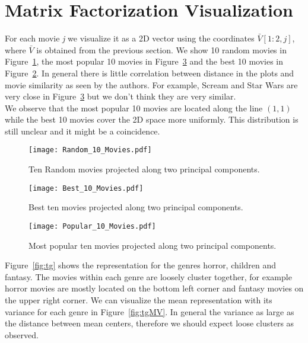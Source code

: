 \section{Matrix Factorization Visualization}

For each movie \textit{j} we visualize it as a 2D vector using the coordinates $\bar{V}[1:2,j]$, where $\bar{V}$ is obtained from the previous section. We show 10 random movies in Figure~\ref{fig:tenRandom}, the most popular 10 movies in Figure~\ref{fig:tenMostPopular} and the best 10 movies in Figure~\ref{fig:tenBest}. In general there is little correlation between distance in the plots and movie similarity as seen by the authors. For example, Scream and Star Wars are very close in Figure~\ref{fig:tenMostPopular} but we don't think they are very similar.\\
We observe that the most popular 10 movies are located along the line $(1,1)$ while the best 10 movies cover the 2D space more uniformly. This distribution is still unclear and it might be a coincidence.  \\





\begin{figure}[hptb]
\centering
\texttt{[image: Random\_10\_Movies.pdf]}
 \caption{Ten Random movies projected along two principal components.}
\label{fig:tenRandom}
\end{figure}


\begin{figure}[hptb]
\centering
\texttt{[image: Best\_10\_Movies.pdf]}
 \caption{Best ten movies projected along two principal components.}
\label{fig:tenBest}
\end{figure}


\begin{figure}[hptb]
\centering
\texttt{[image: Popular\_10\_Movies.pdf]}
 \caption{Most popular ten movies projected along two principal components.}
\label{fig:tenMostPopular}
\end{figure}

Figure~\ref{fig:tg} shows the representation for the genres horror, children and fantasy. The movies within each genre are loosely cluster together, for example horror movies are mostly located on the bottom left corner and fantasy movies on the upper right corner. We can visualize the mean representation with its variance for each genre in Figure~\ref{fig:tgMV}. In general the variance as large as the distance between mean centers, therefore we should expect loose clusters as observed. 


